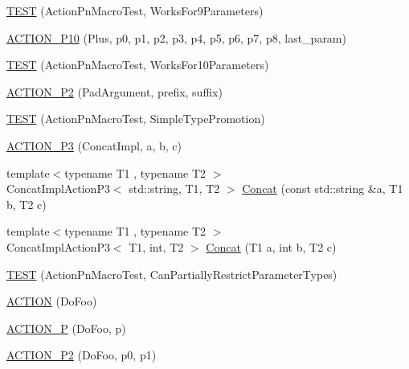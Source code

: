 \begin{DoxyCompactItemize}
\item 
\hyperlink{namespacetesting_1_1gmock__generated__actions__test_a52d6dc447a4a71524adfeb7c8f7b6a68}{T\+E\+ST} (Action\+Pn\+Macro\+Test, Works\+For9\+Parameters)
\item 
\hyperlink{namespacetesting_1_1gmock__generated__actions__test_a3c6e7ef6aefc94efc9e815e92f0b3e47}{A\+C\+T\+I\+O\+N\+\_\+\+P10} (Plus, p0, p1, p2, p3, p4, p5, p6, p7, p8, last\+\_\+param)
\item 
\hyperlink{namespacetesting_1_1gmock__generated__actions__test_a564fd77344f58b26577452a380c93935}{T\+E\+ST} (Action\+Pn\+Macro\+Test, Works\+For10\+Parameters)
\item 
\hyperlink{namespacetesting_1_1gmock__generated__actions__test_ad58030fe83ad47cdb4ff027f8399adb4}{A\+C\+T\+I\+O\+N\+\_\+\+P2} (Pad\+Argument, prefix, suffix)
\item 
\hyperlink{namespacetesting_1_1gmock__generated__actions__test_ad42236ad6c6d01fad6dd947ca6163d59}{T\+E\+ST} (Action\+Pn\+Macro\+Test, Simple\+Type\+Promotion)
\item 
\hyperlink{namespacetesting_1_1gmock__generated__actions__test_ae46434959151b83249e52d4869e28cf0}{A\+C\+T\+I\+O\+N\+\_\+\+P3} (Concat\+Impl, a, b, c)
\item 
{\footnotesize template$<$typename T1 , typename T2 $>$ }\\Concat\+Impl\+Action\+P3$<$ std\+::string, T1, T2 $>$ \hyperlink{namespacetesting_1_1gmock__generated__actions__test_a28213583d5450876b564a3df58d1cf91}{Concat} (const std\+::string \&a, T1 b, T2 c)
\item 
{\footnotesize template$<$typename T1 , typename T2 $>$ }\\Concat\+Impl\+Action\+P3$<$ T1, int, T2 $>$ \hyperlink{namespacetesting_1_1gmock__generated__actions__test_a861e9fadbecf0c66e8226021c6c22013}{Concat} (T1 a, int b, T2 c)
\item 
\hyperlink{namespacetesting_1_1gmock__generated__actions__test_a7222610b197216e7976b3fa751f97daf}{T\+E\+ST} (Action\+Pn\+Macro\+Test, Can\+Partially\+Restrict\+Parameter\+Types)
\item 
\hyperlink{namespacetesting_1_1gmock__generated__actions__test_a183b3863b3c2319ac414fe694455f58c}{A\+C\+T\+I\+ON} (Do\+Foo)
\item 
\hyperlink{namespacetesting_1_1gmock__generated__actions__test_a8487a3396f4f705e134e44584634ef1c}{A\+C\+T\+I\+O\+N\+\_\+P} (Do\+Foo, p)
\item 
\hyperlink{namespacetesting_1_1gmock__generated__actions__test_acd38e742235e154ad309f22e9a470a86}{A\+C\+T\+I\+O\+N\+\_\+\+P2} (Do\+Foo, p0, p1)

\end{DoxyCompactItemize}
